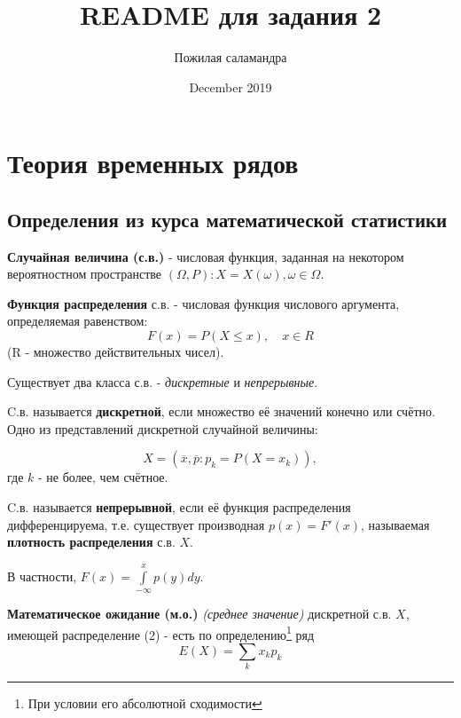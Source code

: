 \documentclass{article}
\title{README для задания 2}
\author{Пожилая саламандра}
\date{December 2019}
\begin{document}
\maketitle

\tableofcontents
\newpage

\section{Теория временных рядов}
  
  \subsection{Определения из курса математической статистики}
  
  \textbf{Случайная величина (с.в.)} - числовая функция, заданная на некотором вероятностном пространстве $(\Omega, P): X = X(\omega), \omega \in \Omega.$\par
  
  \textbf{Функция распределения} с.в. - числовая функция числового аргумента, определяемая равенством:
  \begin{equation}
    F(x) = P(X \leq x), \quad x \in R
  \end{equation}
  (R - множество действительных чисел).\par
  
  Существует два класса с.в. - \textsl{дискретные} и \textsl{непрерывные}.\par
  
  C.в. называется \textbf{дискретной}, если множество её значений конечно или счётно. Одно из представлений дискретной случайной величины:
  
  \begin{equation}
    X = (\overline{x}, \overline{p} : p_k = P(X = x_k)),
  \end{equation}
  где $k$ - не более, чем счётное.\par
  
  C.в. называется \textbf{непрерывной}, если её функция распределения дифференцируема, т.е. существует производная $p(x) = F'(x)$, называемая \textbf{плотность распределения} с.в. $X$.\par
  
  В частности, $F(x) = \int\limits_{-\infty}^x p(y)dy$.  
 
  \textbf{Математическое ожидание (м.о.)} \textsl{(среднее значение)} дискретной с.в. $X$, имеющей распределение (2) - есть по определению\footnote{При условии его абсолютной сходимости} ряд
  \begin{equation}
    E(X) = \sum\limits_k x_kp_k
  \end{equation}
  \par
  
\end{document}
